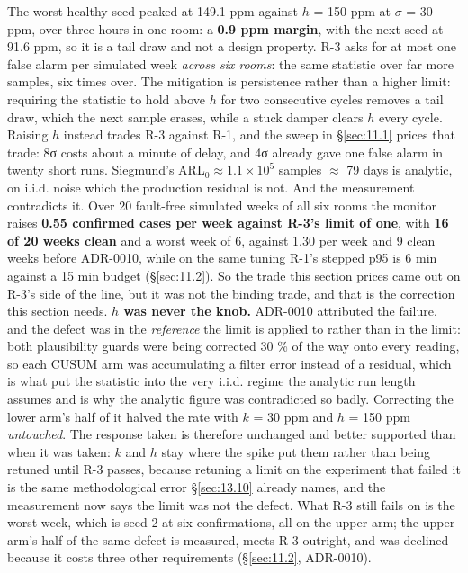 The worst healthy seed peaked at 149.1 ppm against $h$ = 150 ppm at $\sigma$ = 30 ppm, over three
hours in one room: a \textbf{0.9 ppm margin}, with the next seed at 91.6 ppm, so it is a tail draw
and not a design property. R-3 asks for at most one false alarm per simulated week \emph{across six
rooms}: the same statistic over far more samples, six times over. The mitigation is persistence
rather than a higher limit: requiring the statistic to hold above $h$ for two consecutive cycles
removes a tail draw, which the next sample erases, while a stuck damper clears $h$ every cycle.
Raising $h$ instead trades R-3 against R-1, and the sweep in §\ref{sec:11.1} prices that trade: 8σ costs about
a minute of delay, and 4σ already gave one false alarm in twenty short runs. Siegmund's
ARL$_0 \approx 1.1\times10^{5}$ samples $\approx$ 79 days is analytic, on i.i.d. noise which the
production residual is not. And the measurement contradicts it. Over 20 fault-free simulated weeks
of all six rooms the monitor raises \textbf{0.55 confirmed cases per week against R-3's limit of
one}, with \textbf{16 of 20 weeks clean} and a worst week of 6, against 1.30 per week and 9 clean
weeks before ADR-0010, while on the same tuning R-1's stepped p95 is 6 min against a 15 min budget
(§\ref{sec:11.2}). So the trade this section prices came out on R-3's side of the line, but it was not the
binding trade, and that is the correction this section needs. \textbf{$h$ was never the knob.}
ADR-0010 attributed the failure, and the defect was in the \emph{reference} the limit is applied to
rather than in the limit: both plausibility guards were being corrected 30 \% of the way onto every
reading, so each CUSUM arm was accumulating a filter error instead of a residual, which is what put
the statistic into the very i.i.d. regime the analytic run length assumes and is why the analytic
figure was contradicted so badly. Correcting the lower arm's half of it halved the rate with
$k$ = 30 ppm and $h$ = 150 ppm \emph{untouched}. The response taken is therefore unchanged and
better supported than when it was taken: $k$ and $h$ stay where the spike put them rather than
being retuned until R-3 passes, because retuning a limit on the experiment that failed it is the
same methodological error §\ref{sec:13.10} already names, and the measurement now says the limit was not the
defect. What R-3 still fails on is the worst week, which is seed 2 at six confirmations, all on the
upper arm; the upper arm's half of the same defect is measured, meets R-3 outright, and was
declined because it costs three other requirements (§\ref{sec:11.2}, ADR-0010).

